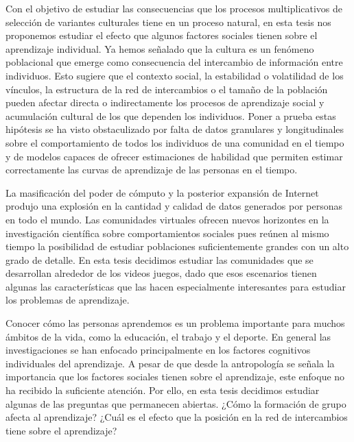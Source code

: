 \documentclass[a4paper,10pt]{book}
\theoremstyle{definition}
\begin{document}
Con el objetivo de estudiar las consecuencias que los procesos multiplicativos de selección de variantes culturales tiene en un proceso natural, en esta tesis nos proponemos estudiar el efecto que algunos factores sociales tienen sobre el aprendizaje individual. 
%
Ya hemos señalado que la cultura es un fen\'omeno poblacional que emerge como consecuencia del intercambio de informaci\'on entre individuos.
%
Esto sugiere que el contexto social, la estabilidad o volatilidad de los v\'inculos, la estructura de la red de intercambios o el tama\~no de la poblaci\'on pueden afectar directa o indirectamente los procesos de aprendizaje social y acumulaci\'on cultural de los que dependen los individuos.
%
Poner a prueba estas hip\'otesis se ha visto obstaculizado por falta de datos granulares y longitudinales sobre el comportamiento de todos los individuos de una comunidad en el tiempo y de modelos capaces de ofrecer estimaciones de habilidad que permiten estimar correctamente las curvas de aprendizaje de las personas en el tiempo.


La masificaci\'on del poder de c\'omputo y la posterior expansi\'on de Internet produjo una explosi\'on en la cantidad y calidad de datos generados por personas en todo el mundo.
%
Las comunidades virtuales ofrecen nuevos horizontes en la investigaci\'on cient\'ifica sobre comportamientos sociales pues re\'unen al mismo tiempo la posibilidad de estudiar poblaciones suficientemente grandes con un alto grado de detalle.
%
En esta tesis decidimos estudiar las comunidades que se desarrollan alrededor de los videos juegos, dado que esos escenarios tienen algunas las caracter\'isticas que las hacen especialmente interesantes para estudiar los problemas de aprendizaje.


Conocer c\'omo las personas aprendemos es un problema importante para muchos \'ambitos de la vida, como la educaci\'on, el trabajo y el deporte.
%
En general las investigaciones se han enfocado principalmente en los factores cognitivos individuales del aprendizaje.
%
A pesar de que desde la antropolog\'ia se se\~nala la importancia que los factores sociales tienen sobre el aprendizaje, este enfoque no ha recibido la suficiente atenci\'on.
%
Por ello, en esta tesis decidimos estudiar algunas de las preguntas que permanecen abiertas.
%
¿C\'omo la formaci\'on de grupo afecta al aprendizaje?
%
¿Cu\'al es el efecto que la posici\'on en la red de intercambios tiene sobre el aprendizaje?
\end{document}
